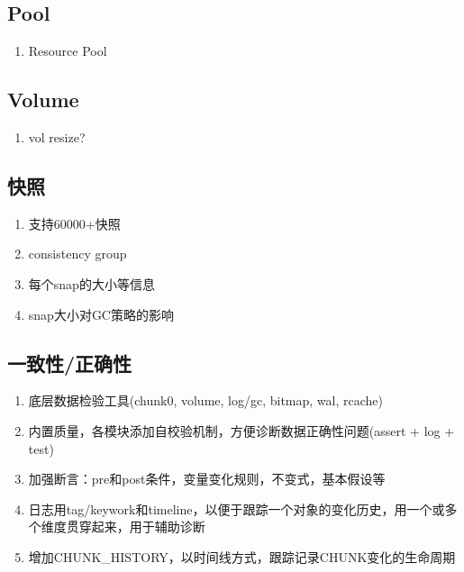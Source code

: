 \documentclass[UTF8]{ctexart}
\begin{document}
\subsection{Pool}

\begin{enumerate}
    \item Resource Pool
\end{enumerate}

\subsection{Volume}

\begin{enumerate}
    \item vol resize?
\end{enumerate}

\subsection{快照}

\begin{enumerate}
    \item 支持60000+快照
    \item consistency group
    \item 每个snap的大小等信息
    \item snap大小对GC策略的影响
\end{enumerate}

\subsection{一致性/正确性}

\begin{tcolorbox}
\begin{enumerate}
    \item 底层数据检验工具(chunk0, volume, log/gc, bitmap, wal, rcache)
    \item 内置质量，各模块添加自校验机制，方便诊断数据正确性问题(assert + log + test)
    \item 加强断言：pre和post条件，变量变化规则，不变式，基本假设等
    \item 日志用tag/keywork和timeline，以便于跟踪一个对象的变化历史，用一个或多个维度贯穿起来，用于辅助诊断
    \item 增加CHUNK\_HISTORY，以时间线方式，跟踪记录CHUNK变化的生命周期
\end{enumerate}
\end{tcolorbox}
\end{document}
